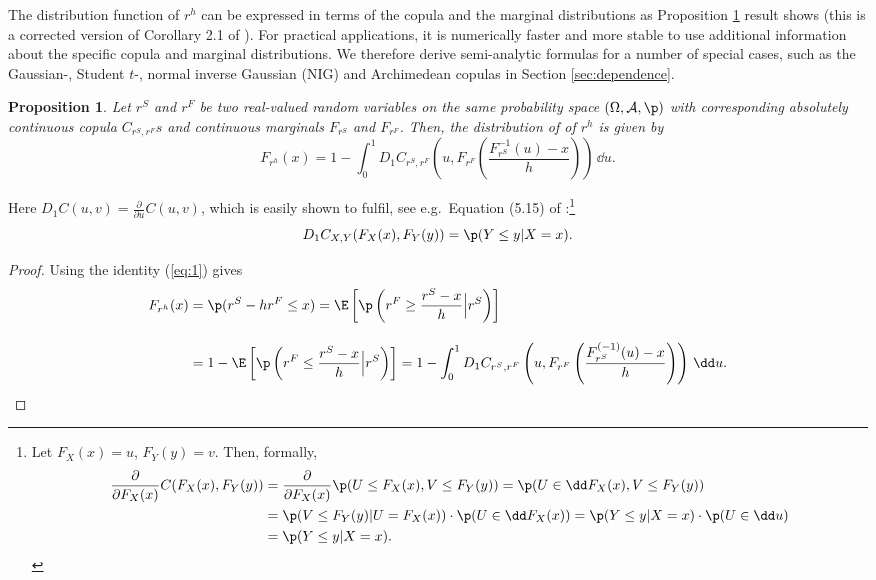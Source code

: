 \documentclass[square]{article} %
\theoremstyle{plain}
\newtheorem{proposition}[theorem]{Proposition}
\theoremstyle{definition} %
\begin{document}
The distribution function of $r^h$ can be expressed in terms of the
copula and the marginal distributions as Proposition \ref{prop:dfrh}
result shows (this is a corrected version of Corollary 2.1 of
\citep{Barbi2014}). For practical applications, it is numerically
faster and more stable to use additional information about the
specific copula and marginal distributions. We therefore derive
semi-analytic formulas for a number of special cases, such as the
Gaussian-, Student $t$-, normal inverse Gaussian (NIG) and Archimedean
copulas in Section \ref{sec:dependence}.

\begin{proposition}
  \label{prop:dfrh}
  Let $r^S$ and $r^F$ be two real-valued random variables on the same
  probability space $(\Omega, \mathcal A, \p)$ with corresponding
  absolutely continuous copula $C_{r^S, r^F}s$ and
  continuous marginals $F_{r^S}$ and $F_{r^F}$. Then, the distribution
  of of $r^h$ is given by
  \begin{equation}
    \label{eq:3}
    F_{r^h}(x) = 1- \int^1_0 D_1 C_{r^S, r^F}
    \left( u, F_{r^F} \left( \frac{F^{-1}_{r^S}(u)-x}{h} \right)
    \right)\, \dd u.
  \end{equation}
\end{proposition}\medskip
Here $D_1 C(u,v)=\displaystyle \frac{\partial}{\partial u} C(u,v)$,
which is easily shown to fulfil, see e.g.\ Equation (5.15) of
\citep{McNeil2005}:\footnote{%
  Let $F_X(x)=u$, $F_Y(y)=v$. Then, formally,
  \begin{align*}
    \frac{\partial}{\partial F_X(x)} C(F_X(x), F_Y(y)) %
    &= \frac{\partial}{\partial F_X(x)} \p(U\leq F_X(x),
      V\leq F_Y(y)) %
      = \p(U\in \dd F_X(x), V\leq F_Y(y))\\ %
    &= \p(V\leq F_Y(y)| U = F_X(x))\cdot \p(U \in \dd
      F_X(x)) %
      = \p(Y\leq y|X=x)\cdot \p(U\in \dd u)\\ %
    &= \p(Y\leq y|X=x).
  \end{align*}}
\begin{equation}
  \label{eq:1}
  D_1 C_{X,Y}(F_X(x), F_Y(y)) = \p(Y\leq y|X=x).
\end{equation}
\begin{proof}
  Using the identity (\ref{eq:1}) gives
  \begin{align*}
    F_{r^h}(x) &= \p(r^S - h r^F\leq x) %
                 = \E\left[\p\left(r^F\geq \frac{r^S-x}{h}\Big|
                 r^S\right)\right]\\[10pt]
               &= 1-\E\left[\p\left(r^F\leq \frac{r^S-x}{h}\Big|
                 r^S\right)\right]%
               = 1- \int_0^1 D_1 C_{r^S, r^F}\left(u,
                 F_{r^F}\left(\frac{F^{(-1)}_{r^S}(u) -
                 x}{h}\right)\right)\, \dd u.
  \end{align*}
\end{proof}\medskip
\end{document}
